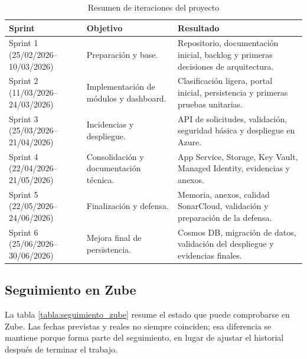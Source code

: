 \begin{table}[h]
\centering
\small
\begin{tabularx}{\textwidth}{l X X}
\textbf{Sprint} & \textbf{Objetivo} & \textbf{Resultado} \\
\hline
Sprint 1 (25/02/2026--10/03/2026) & Preparación y base. & Repositorio, documentación inicial, backlog y primeras decisiones de arquitectura. \\
Sprint 2 (11/03/2026--24/03/2026) & Implementación de módulos y dashboard. & Clasificación ligera, portal inicial, persistencia y primeras pruebas unitarias. \\
Sprint 3 (25/03/2026--21/04/2026) & Incidencias y despliegue. & API de solicitudes, validación, seguridad básica y despliegue en Azure. \\
Sprint 4 (22/04/2026--21/05/2026) & Consolidación y documentación técnica. & App Service, Storage, Key Vault, Managed Identity, evidencias y anexos. \\
Sprint 5 (22/05/2026--24/06/2026) & Finalización y defensa. & Memoria, anexos, calidad SonarCloud, validación y preparación de la defensa. \\
Sprint 6 (25/06/2026--30/06/2026) & Mejora final de persistencia. & Cosmos DB, migración de datos, validación del despliegue y evidencias finales. \\
\end{tabularx}
\caption{Resumen de iteraciones del proyecto}
\end{table}

\subsection{Seguimiento en Zube}

La tabla \ref{tabla:seguimiento_zube} resume el estado que puede comprobarse en Zube. Las fechas previstas y reales no siempre coinciden; esa diferencia se mantiene porque forma parte del seguimiento, en lugar de ajustar el historial después de terminar el trabajo.

